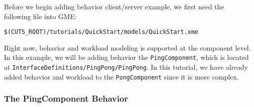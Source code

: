 Before we begin adding behavior client/server example, we first 
need the following file into GME:
\begin{lstlisting}
$(CUTS_ROOT)/tutorials/QuickStart/models/QuickStart.xme
\end{lstlisting}

\noindent Right now, behavior and workload modeling is supported 
at the component level. In this example, we will be adding behavior the 
\texttt{PingComponent}, which is located at 
\texttt{InterfaceDe\-fi\-ni\-tions/PingPong/PingPong}. In 
this tutorial, we have already added behavior and workload to 
the \texttt{PongComponent} since it is more complex.

\subsubsection{The PingComponent Behavior}

